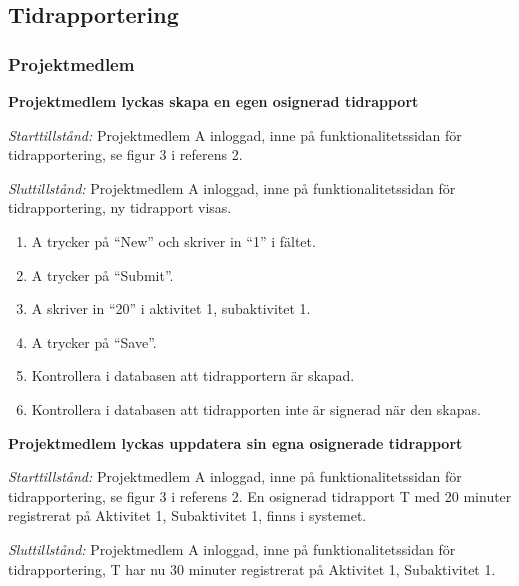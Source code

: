 \documentclass[a4paper]{article}
\begin{document}

\subsection{Tidrapportering}

\subsubsection{Projektmedlem}

\begin{FT}

\item\textbf{Projektmedlem lyckas skapa en egen osignerad tidrapport}

\emph{Starttillstånd:} Projektmedlem A inloggad, inne på funktionalitetssidan för tidrapportering, se figur 3 i referens 2.

\emph{Sluttillstånd:} Projektmedlem A inloggad, inne på funktionalitetssidan för tidrapportering, ny tidrapport visas.

\begin{enumerate}
\item A trycker på ``New'' och skriver in ``1'' i fältet.
\item A trycker på ``Submit''.
\item A skriver in ``20'' i aktivitet 1, subaktivitet 1.
\item A trycker på ``Save''.
\item Kontrollera i databasen att tidrapportern är skapad.
\item Kontrollera i databasen att tidrapporten inte är signerad när den skapas.
\end{enumerate}


\item\textbf{Projektmedlem lyckas uppdatera sin egna osignerade tidrapport}

\emph{Starttillstånd:} Projektmedlem A inloggad, inne på funktionalitetssidan för tidrapportering, se figur 3 i referens 2. En osignerad tidrapport T med 20 minuter registrerat på Aktivitet 1, Subaktivitet 1, finns i systemet.

\emph{Sluttillstånd:} Projektmedlem A inloggad, inne på funktionalitetssidan för tidrapportering, T har nu 30 minuter registrerat på Aktivitet 1, Subaktivitet 1.


\end{FT}
\end{document}
